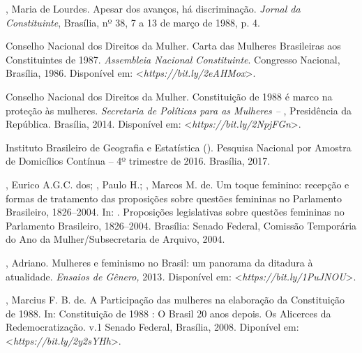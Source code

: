 \begin{Parskip}
, Maria de Lourdes. Apesar dos avanços, há discriminação. \emph{Jornal
da Constituinte}, Brasília, nº 38, 7 a 13 de março de 1988, p. 4.

Conselho Nacional dos Direitos da Mulher. Carta das Mulheres Brasileiras
aos Constituintes de 1987. \emph{Assembleia Nacional Constituinte}.
Congresso Nacional, Brasília, 1986. Disponível em:
\textless{}\emph{https://bit.ly/2eAHMox}\textgreater{}.

Conselho Nacional dos Direitos da Mulher. Constituição de 1988
é marco na proteção às mulheres. \emph{Secretaria de Políticas para as
Mulheres -- }, Presidência da República. Brasília, 2014.
Disponível em:
\textless{}\emph{https://bit.ly/2NpjFGn}\textgreater{}.

Instituto Brasileiro de Geografia e Estatística (). Pesquisa
Nacional por Amostra de Domicílios Contínua -- 4º trimestre de 2016.
Brasília, 2017.

, Eurico A.G.C. dos; , Paulo H.; , Marcos M. de. Um
toque feminino: recepção e formas de tratamento das proposições sobre
questões femininas no Parlamento Brasileiro, 1826--2004. In: 
. Proposições legislativas sobre questões femininas no Parlamento
Brasileiro, 1826--2004. Brasília: Senado Federal, Comissão Temporária do
Ano da Mulher/Subsecretaria de Arquivo, 2004.

, Adriano. Mulheres e feminismo no Brasil: um panorama da
ditadura à atualidade. \emph{Ensaios de Gênero,} 2013\emph{.} Disponível
em: \textless{}\emph{https://bit.ly/1PuJNOU}\textgreater{}.

, Marcius F. B. de. A Participação das mulheres na elaboração da
Constituição de 1988. In: Constituição de 1988 : O Brasil 20 anos
depois. Os Alicerces da Redemocratização. v.1 Senado Federal, Brasília,
2008. Diponível em: \textless{}\emph{https://bit.ly/2y2sYHh}\textgreater{}.
\end{Parskip}